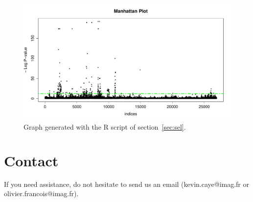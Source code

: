 \documentclass[10pt,a4paper]{article}
\begin{document}

\begin{figure}[h!]\centering
\includegraphics[width=\linewidth]{manhattanPlot.pdf}
\caption{Graph generated with the R script of section~\ref{sec:sel}.}\label{fig:manhattanPlot}
\end{figure} 

\section{Contact}
If you need assistance, do not hesitate to send us an email (kevin.caye@imag.fr or olivier.francois@imag.fr). 



\end{document}
